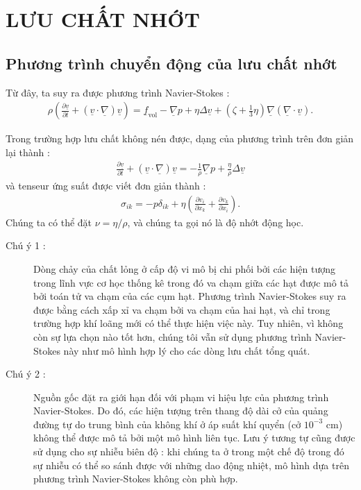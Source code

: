 \documentclass[CO_LUU_CHAT.tex]{subfiles}
\begin{document}
\chapter{LƯU CHẤT NHỚT}
\newpage
\section{Phương trình chuyển động của lưu chất nhớt}
Từ đây, ta suy ra được phương trình Navier-Stokes :
\begin{equation}
    \begin{aligned}
        \rho\left(\frac{\partial\underline{v}}{\partial t}+\left(\underline{v}\cdot\underline{\nabla}\right)\underline{v}\right)=\underline{f}_{\text{vol}}-\underline{\nabla}p+\eta\Delta\underline{v}+\left(\zeta+\frac{1}{3}\eta\right)\underline{\nabla}\left(\underline{\nabla}\cdot\underline{v}\right).
    \end{aligned}
\end{equation}

Trong trường hợp lưu chất không nén được, dạng của phương trình trên đơn giản lại thành :
\begin{equation}
    \begin{aligned}
        \frac{\partial\underline{v}}{\partial t}+\left(\underline{v}\cdot\underline{\nabla}\right)\underline{v}=-\frac{1}{\rho}\underline{\nabla}p+\frac{\eta}{\rho}\Delta\underline{v}
    \end{aligned}
\end{equation}
và tenseur ứng suất được viết đơn giản thành :
\begin{equation}
    \begin{aligned}
        \sigma_{ik}=-p\delta_{ik}+\eta\left(\frac{\partial v_i}{\partial x_k}+\frac{\partial v_k}{\partial x_i}\right).
    \end{aligned}
\end{equation}
Chúng ta có thể đặt $\nu=\eta/\rho$, và chúng ta gọi nó là độ nhớt động học.

\begin{description}
	\item[Chú ý 1 :] Dòng chảy của chất lỏng ở cấp độ vi mô bị chi phối bởi các hiện tượng trong lĩnh vực cơ học thống kê trong đó va chạm giữa các hạt được mô tả bởi toán tử va chạm của các cụm hạt. Phương trình Navier-Stokes suy ra được bằng cách xấp xỉ va chạm bởi va chạm của hai hạt, và chỉ trong trường hợp khí loãng mới có thể thực hiện việc này. Tuy nhiên, vì không còn sự lựa chọn nào tốt hơn, chúng tôi vẫn sử dụng phương trình Navier-Stokes này như mô hình hợp lý cho các dòng lưu chất tổng quát.
	
	\item[Chú ý 2 :] Nguồn gốc đặt ra giới hạn đối với phạm vi hiệu lực của phương trình Navier-Stokes. Do đó, các hiện tượng trên thang độ dài cở của quảng đường tự do trung bình của không khí ở áp suất khí quyển (cở $10^{-3}$ cm) không thể được mô tả bởi một mô hình liên tục. Lưu ý tương tự cũng được sử dụng cho sự nhiễu biên độ : khi chúng ta ở trong một chế độ trong đó sự nhiễu có thể so sánh được với những dao động nhiệt, mô hình dựa trên phương trình Navier-Stokes không còn phù hợp.
\end{description}
\end{document}

